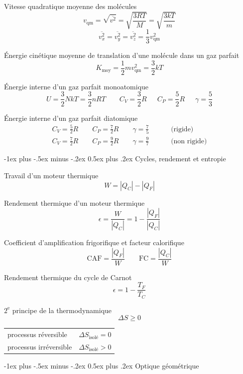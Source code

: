\documentclass[10pt,landscape]{article}
\makeatletter
\renewcommand{\section}{\@startsection{section}{1}{0mm}%
                                {-1ex plus -.5ex minus -.2ex}%
                                {0.5ex plus .2ex}%
                                {\normalfont\large\bfseries}}
\newcommand{\halfline}{\vspace{0.5em}}
\newcommand{\tableindent}{\hspace{1.5em}}
\makeatother
\begin{document}
\begin{multicols}{3}
Vitesse quadratique moyenne des molécules
\[ v_\text{qm} = \sqrt{\overline{v^2}}
= \sqrt{\frac{3RT}{M}} 
= \sqrt{\frac{3kT}{m}} \]
\[ \overline{v^2_x} =  \overline{v^2_y} = \overline{v^2_z} = \frac{1}{3} v^2_\text{qm}  \]

Énergie cinétique moyenne de translation d'une molécule dans un gaz parfait
\[ K_\text{moy} = \frac{1}{2} mv^2_\text{qm} = \frac{3}{2} kT \]

Énergie interne d'un gaz parfait monoatomique
\[ U = \frac{3}{2} NkT = \frac{3}{2} nRT \qquad
 C_V = \frac{3}{2} R 
\quad\enspace
C_P = \frac{5}{2} R
\quad\enspace
\gamma = \frac{5}{3} \]

Énergie interne d'un gaz parfait diatomique
\begin{align*}
	C_V = \frac{5}{2} R  \qquad 
	C_P = \frac{7}{2} R  \qquad
	\gamma = \frac{7}{5} \qquad &\text{ (rigide)} \\
	C_V = \frac{7}{2} R \qquad 
	C_P = \frac{9}{2} R  \qquad
	\gamma = \frac{9}{7} \qquad &\text{ (non rigide)}
\end{align*}

\hrulefill

\section{Cycles, rendement et entropie}

Travail d'un moteur thermique
\[ W = |Q_C| - |Q_F| \]

Rendement thermique d'un moteur thermique
\[ \epsilon=\frac{W}{|Q_C|} = 1 - \frac{|Q_F|}{|Q_C|} \]

Coefficient d'amplification frigorifique et facteur calorifique
\[ \text{CAF} = \frac{|Q_F|}{W} \qquad
\text{FC} = \frac{|Q_C|}{W} \]

Rendement thermique du cycle de Carnot
\[ \epsilon= 1- \frac{T_F}{T_C} \]

$2^\text{e}$ principe de la thermodynamique
\[ \Delta S \geq 0 \]

\begin{tabular}{@{\tableindent}ll}
	processus réversible & $\Delta S_\text{isolé} = 0$ \\
	processus irréversible & $\Delta S_\text{isolé} > 0$ \\
\end{tabular}
\halfline

\hrulefill


\section{Optique géométrique}


\end{multicols}
\end{document}
